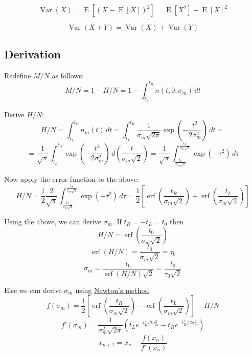 \documentclass[12pt]{article}
\begin{document}
\begin{equation}
\operatorname{Var} (X) = \operatorname {E} \left[(X-\operatorname {E} [X])^{2}\right] = \operatorname {E} \left[X^{2}\right]-\operatorname {E} [X]^{2}
\label{eq:def_Variance}
\end{equation}

\begin{equation}
\operatorname {Var} (X+Y)=\operatorname {Var} (X)+\operatorname {Var} (Y)
\label{eq:def_Variance_sum}
\end{equation}

\pagebreak

\subsection*{Derivation}

Redefine \( M / N \) as follows:
\begin{equation}
M / N = 1 - H / N =
1 - \int_{t_L}^{t_R} n(t, 0, \sigma_m) \,dt
\end{equation}

Derive \( H / N \):
\[
H / N = \int_{t_L}^{t_R} n_m(t) \,dt =
\int_{t_L}^{t_R} \frac{1}{\sigma_m\sqrt{2\pi}} \exp\left(-\frac{t^2}{2\sigma_m^2} \right) \,dt =
\]
\[
= \frac{1}{\sqrt{\pi}} \int_{t_L}^{t_R} \exp\left(-\frac{t^2}{2\sigma_m^2} \right) \,d\left(\frac{t}{\sigma_m\sqrt{2}}\right) =
\frac{1}{\sqrt{\pi}} \int_{\frac{t_L}{\sigma_m\sqrt{2}}}^{\frac{t_R}{\sigma_m\sqrt{2}}} \exp\left(-\tau^2 \right) \,d\tau
\]

Now apply the error function to the above:
\[
H / N = \frac{1}{2}\frac{2}{\sqrt{\pi}} \int_{\frac{t_L}{\sigma_m\sqrt{2}}}^{\frac{t_R}{\sigma_m\sqrt{2}}} \exp\left(-\tau^2 \right) \,d\tau =
\frac{1}{2} \left[ \operatorname{erf}\left(\frac{t_R}{\sigma_m\sqrt{2}}\right) - \operatorname{erf}\left(\frac{t_L}{\sigma_m\sqrt{2}}\right) \right]
\]

Using the above, we can derive \(\sigma_m\).
If \(t_R = -t_L = t_0\) then
\[
H / N = \operatorname{erf}\left(\frac{t_0}{\sigma_m\sqrt{2}}\right)
\]
\[
\operatorname{erf}\left(H / N\right) = \frac{t_0}{\sigma_m\sqrt{2}} = \tau_0
\]
\[
\sigma_m = \frac{t_0}{\operatorname{erf}\left(H / N\right)\sqrt{2}} = \frac{t_0}{\tau_0\sqrt{2}}
\]

Else we can derive \(\sigma_m\) using \href{https://en.wikipedia.org/wiki/Newton%27s_method}{Newton's method}:
\[
f(\sigma_m) = \frac{1}{2} \left[
    \operatorname{erf}\left(\frac{t_R}{\sigma_m\sqrt{2}}\right) -
    \operatorname{erf}\left(\frac{t_L}{\sigma_m\sqrt{2}}\right)
\right] - H / N
\]
\[
f'(\sigma_m) = \frac{1}{\sigma_m^2\sqrt{2\pi}} \left(
    t_L e^{-t_L^2/2\sigma_m^2} -
    t_R e^{-t_R^2/2\sigma_m^2}
\right)
\]
\[
    x_{n+1}=x_{n}-{\frac {f(x_{n})}{f'(x_{n})}}
\]
\end{document}
